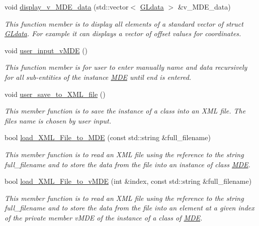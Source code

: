\begin{DoxyCompactItemize}
void \hyperlink{group__group__display_ga38a0f84bbf5c8652014c84fa7ce92610}{display\+\_\+v\+\_\+\+M\+D\+E\+\_\+data} (std\+::vector$<$ \hyperlink{structGLdata}{G\+Ldata} $>$ \&v\+\_\+\+M\+D\+E\+\_\+data)
\begin{DoxyCompactList}\small\item\em This function member is to display all elements of a standard vector of struct \hyperlink{structGLdata}{G\+Ldata}. For example it can displays a vector of offset values for coordinates. \end{DoxyCompactList}\item 
void \hyperlink{classMDE_abfe9ff721cd10f55b8f641ef7674d4ab}{user\+\_\+input\+\_\+v\+M\+DE} ()
\begin{DoxyCompactList}\small\item\em This function member is for user to enter manually \textquotesingle{}name\textquotesingle{} and \textquotesingle{}data\textquotesingle{} recursively for all sub-\/entities of the instance \hyperlink{classMDE}{M\+DE} until \textquotesingle{}end\textquotesingle{} is entered. \end{DoxyCompactList}\item 
void \hyperlink{group__group__io_gab0bb5af067d456163cd8d672945acc20}{user\+\_\+save\+\_\+to\+\_\+\+X\+M\+L\+\_\+file} ()
\begin{DoxyCompactList}\small\item\em This member function is to save the instance of a class into an X\+ML file. The file\textquotesingle{}s name is chosen by user input. \end{DoxyCompactList}\item 
bool \hyperlink{group__group__io_ga299e26c85332bf5effaa64d986184cc6}{load\+\_\+\+X\+M\+L\+\_\+\+File\+\_\+to\+\_\+\+M\+DE} (const std\+::string \&full\+\_\+filename)
\begin{DoxyCompactList}\small\item\em This member function is to read an X\+ML file using the reference to the string full\+\_\+filename and to store the data from the file into an instance of class \hyperlink{classMDE}{M\+DE}. \end{DoxyCompactList}\item 
bool \hyperlink{group__group__io_gaf9e35ce2a8841994485c22e9744a939f}{load\+\_\+\+X\+M\+L\+\_\+\+File\+\_\+to\+\_\+v\+M\+DE} (int \&index, const std\+::string \&full\+\_\+filename)
\begin{DoxyCompactList}\small\item\em This member function is to read an X\+ML file using the reference to the string full\+\_\+filename and to store the data from the file into an element at a given index of the private member v\+M\+DE of the instance of a class of \hyperlink{classMDE}{M\+DE}. \end{DoxyCompactList}\item 

\end{DoxyCompactItemize}
